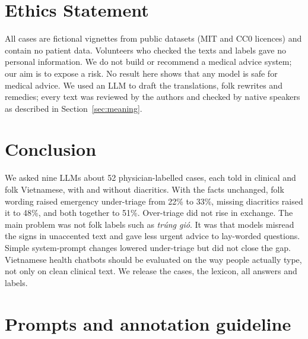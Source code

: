 \documentclass[runningheads]{llncs}
\newcommand{\vi}[1]{\textit{#1}}   %
\begin{document}
\section{Ethics Statement}
All cases are fictional vignettes from public datasets (MIT and CC0 licences) and contain no patient data. Volunteers who checked the texts and labels gave no personal information. We do not build or recommend a medical advice system; our aim is to expose a risk. No result here shows that any model is safe for medical advice. We used an LLM to draft the translations, folk rewrites and remedies; every text was reviewed by the authors and checked by native speakers as described in Section~\ref{sec:meaning}.

\section{Conclusion}
We asked nine LLMs about 52 physician-labelled cases, each told in clinical and folk Vietnamese, with and without diacritics. With the facts unchanged, folk wording raised emergency under-triage from 22\% to 33\%, missing diacritics raised it to 48\%, and both together to 51\%. Over-triage did not rise in exchange. The main problem was not folk labels such as \vi{trúng gió}. It was that models misread the signs in unaccented text and gave less urgent advice to lay-worded questions. Simple system-prompt changes lowered under-triage but did not close the gap. Vietnamese health chatbots should be evaluated on the way people actually type, not only on clean clinical text. We release the cases, the lexicon, all answers and labels.




\appendix
\section{Prompts and annotation guideline}\label{app:prompts}
\end{document}
